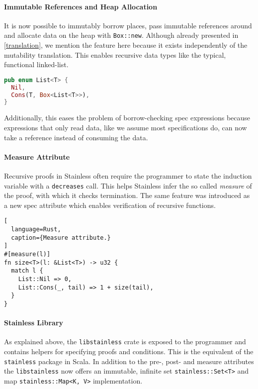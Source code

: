 \paragraph{Immutable References and Heap Allocation}

It is now possible to immutably borrow places, pass immutable references
around and allocate data on the heap with
\passthrough{\lstinline!Box::new!}. Although already presented in
\autoref{translation}, we mention the feature here because it exists
independently of the mutability translation. This enables recursive data
types like the typical, functional linked-list.

\begin{lstlisting}[language=Rust]
pub enum List<T> {
  Nil,
  Cons(T, Box<List<T>>),
}
\end{lstlisting}

Additionally, this eases the problem of borrow-checking spec expressions
because expressions that only read data, like we assume most
specifications do, can now take a reference instead of consuming the
data.

\paragraph{Measure Attribute}

Recursive proofs in Stainless often require the programmer to state the
induction variable with a \passthrough{\lstinline!decreases!} call. This
helps Stainless infer the so called \emph{measure} of the proof, with
which it checks termination. The same feature was introduced as a new
spec attribute which enables verification of recursive functions.

\begin{lstlisting}[
  language=Rust,
  caption={Measure attribute.}
]
#[measure(l)]
fn size<T>(l: &List<T>) -> u32 {
  match l {
    List::Nil => 0,
    List::Cons(_, tail) => 1 + size(tail),
  }
}
\end{lstlisting}

\paragraph{Stainless Library}

As explained above, the \passthrough{\lstinline!libstainless!} crate is
exposed to the programmer and contains helpers for specifying proofs and
conditions. This is the equivalent of the
\passthrough{\lstinline!stainless!} package in Scala. In addition to the
pre-, post- and measure attributes the
\passthrough{\lstinline!libstainless!} now offers an immutable, infinite
set \passthrough{\lstinline!stainless::Set<T>!} and map
\passthrough{\lstinline!stainless::Map<K, V>!} implementation.

